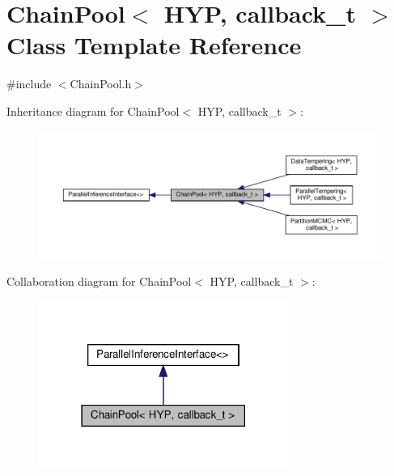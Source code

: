 \hypertarget{class_chain_pool}{}\section{Chain\+Pool$<$ H\+YP, callback\+\_\+t $>$ Class Template Reference}
\label{class_chain_pool}


{\ttfamily \#include $<$Chain\+Pool.\+h$>$}



Inheritance diagram for Chain\+Pool$<$ H\+YP, callback\+\_\+t $>$\+:
\nopagebreak
\begin{figure}[H]
\begin{center}
\leavevmode
\includegraphics[width=350pt]{class_chain_pool__inherit__graph}
\end{center}
\end{figure}


Collaboration diagram for Chain\+Pool$<$ H\+YP, callback\+\_\+t $>$\+:
\nopagebreak
\begin{figure}[H]
\begin{center}
\leavevmode
\includegraphics[width=231pt]{class_chain_pool__coll__graph}
\end{center}
\end{figure}
